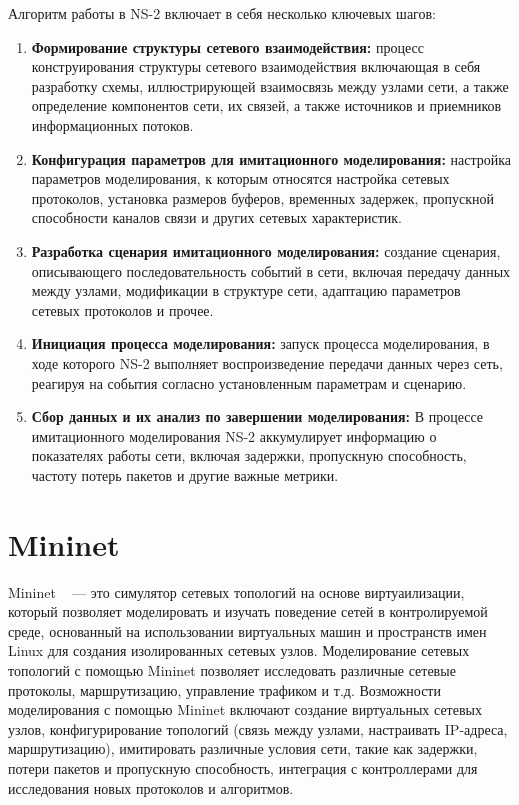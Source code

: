 Алгоритм работы в NS-2 включает в себя несколько ключевых шагов:
\begin{enumerate}
\item \textbf{Формирование структуры сетевого взаимодействия:} процесс конструирования структуры сетевого взаимодействия включающая в себя разработку схемы, 
иллюстрирующей взаимосвязь между узлами сети, а также определение компонентов сети, их связей, а также источников и приемников информационных потоков.
\item \textbf{Конфигурация параметров для имитационного моделирования:} настройка параметров моделирования, к которым относятся настройка сетевых протоколов, 
установка размеров буферов, временных задержек, пропускной способности каналов связи и других сетевых характеристик.
\item \textbf{Разработка сценария имитационного моделирования:} создание сценария, описывающего последовательность событий в сети, включая передачу данных между узлами, 
модификации в структуре сети, адаптацию параметров сетевых протоколов и прочее.
\item \textbf{Инициация процесса моделирования:} запуск процесса моделирования, в ходе которого NS-2 выполняет воспроизведение передачи данных через сеть, реагируя на 
события согласно установленным параметрам и сценарию.
\item \textbf{Сбор данных и их анализ по завершении моделирования:} В процессе имитационного моделирования NS-2 аккумулирует информацию о показателях работы сети, 
включая задержки, пропускную способность, частоту потерь пакетов и другие важные метрики.
\end{enumerate}

\section{Mininet}
\label{chap1:sec2}

Mininet ~\cite{mininet} — это симулятор сетевых топологий на основе виртуаилизации,
который позволяет моделировать и изучать поведение сетей в
контролируемой среде, основанный на использовании виртуальных машин и
пространств имен Linux для создания изолированных сетевых
узлов. Моделирование сетевых топологий с помощью Mininet позволяет
исследовать различные сетевые протоколы, маршрутизацию, управление
трафиком и т.д. Возможности моделирования с помощью Mininet включают
создание виртуальных сетевых узлов, конфигурирование топологий (связь
между узлами, настраивать IP-адреса, маршрутизацию), имитировать
различные условия сети, такие как задержки, потери пакетов и
пропускную способность, интеграция с контроллерами для исследования
новых протоколов и алгоритмов. 

